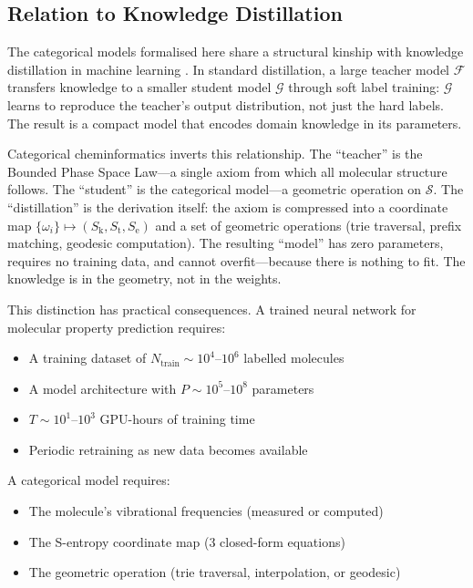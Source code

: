 \documentclass[11pt,twocolumn,a4paper]{article}
\theoremstyle{definition}
\theoremstyle{remark}
\newcommand{\Sk}{S_{\mathrm{k}}}
\newcommand{\St}{S_{\mathrm{t}}}
\newcommand{\Se}{S_{\mathrm{e}}}
\newcommand{\Sspace}{\mathcal{S}}
\newcommand{\Teacher}{\mathcal{F}}
\newcommand{\Student}{\mathcal{G}}
\begin{document}
\subsection{Relation to Knowledge Distillation}

The categorical models formalised here share a structural kinship with knowledge distillation in machine learning \citep{hinton2015, gou2021}. In standard distillation, a large teacher model $\Teacher$ transfers knowledge to a smaller student model $\Student$ through soft label training: $\Student$ learns to reproduce the teacher's output distribution, not just the hard labels. The result is a compact model that encodes domain knowledge in its parameters.

Categorical cheminformatics inverts this relationship. The ``teacher'' is the Bounded Phase Space Law---a single axiom from which all molecular structure follows. The ``student'' is the categorical model---a geometric operation on $\Sspace$. The ``distillation'' is the derivation itself: the axiom is compressed into a coordinate map $\{\omega_i\} \mapsto (\Sk, \St, \Se)$ and a set of geometric operations (trie traversal, prefix matching, geodesic computation). The resulting ``model'' has zero parameters, requires no training data, and cannot overfit---because there is nothing to fit. The knowledge is in the geometry, not in the weights.

This distinction has practical consequences. A trained neural network for molecular property prediction requires:
\begin{itemize}[nosep]
\item A training dataset of $N_{\mathrm{train}} \sim 10^4$--$10^6$ labelled molecules
\item A model architecture with $P \sim 10^5$--$10^8$ parameters
\item $T \sim 10^1$--$10^3$ GPU-hours of training time
\item Periodic retraining as new data becomes available
\end{itemize}

A categorical model requires:
\begin{itemize}[nosep]
\item The molecule's vibrational frequencies (measured or computed)
\item The S-entropy coordinate map (3 closed-form equations)
\item The geometric operation (trie traversal, interpolation, or geodesic)
\end{itemize}
\end{document}
